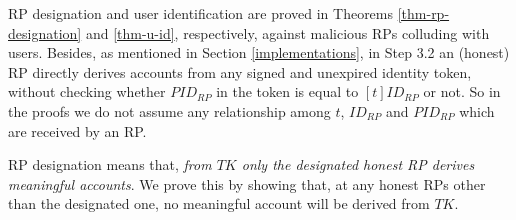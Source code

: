 RP designation and user identification are proved in Theorems \ref{thm-rp-designation} and \ref{thm-u-id}, respectively, against malicious RPs colluding with users.
Besides, as mentioned in Section \ref{implementations}, 
in Step 3.2 an (honest) RP directly derives accounts from any signed and unexpired identity token, without checking whether $PID_{RP}$ in the token is equal to $[t]ID_{RP}$ or not.
So in the proofs we do not assume any relationship among $t$, $ID_{RP}$ and $PID_{RP}$ which are received by an RP.








RP designation means that, \emph{from $TK$ only the designated honest RP derives meaningful accounts}.
We prove this by showing that,
    at any honest RPs other than the designated one, no meaningful account will be derived from $TK$.


